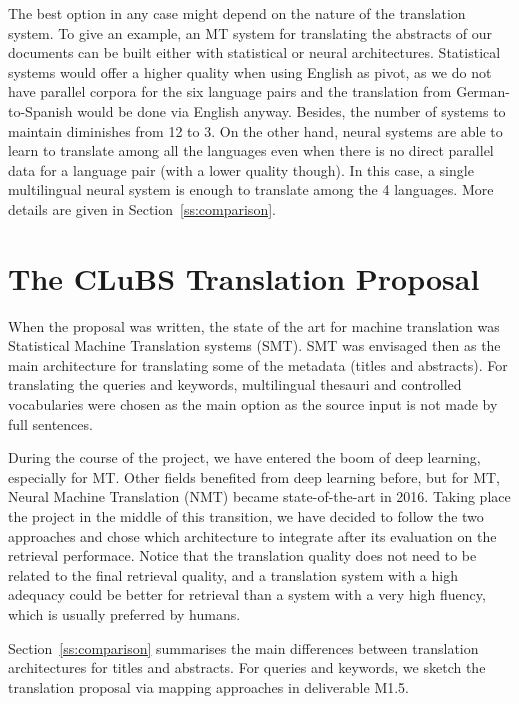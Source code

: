 \documentclass[a4paper,11pt]{article}
\begin{document}
The best option in any case might depend on the nature of the translation system. To give an example, an MT system for translating the abstracts of our documents can be built either with statistical or neural architectures. Statistical systems would offer a higher quality when using English as pivot, as we do not have parallel corpora for the six language pairs and the translation from German-to-Spanish would be done via English anyway. Besides, the number of systems to maintain diminishes from 12 to 3.
On the other hand, neural systems are able to learn to translate among all the languages even when there is no direct parallel data for a language pair (with a lower quality though). In this case, a single multilingual neural system is enough to translate among the 4 languages. More details are given in Section~\ref{ss:comparison}.



\section{The CLuBS Translation Proposal}
\label{s:proposal}

When the proposal was written, the state of the art for machine translation was Statistical Machine Translation systems (SMT). SMT was envisaged then as the main architecture for translating some of the metadata (titles and abstracts). For translating the queries and keywords, multilingual thesauri and controlled vocabularies were chosen as the main option as the source input is not made by full sentences.

During the course of the project, we have entered the boom of deep learning, especially for MT. Other fields benefited from deep learning before, but for MT, Neural Machine Translation (NMT) became state-of-the-art in 2016. Taking place the project in the middle of this transition, we have decided to follow the two approaches and chose which architecture to integrate after its evaluation on the retrieval performace. Notice that the translation quality does not need to be related to the final retrieval quality, and a translation system with a high adequacy could be better for retrieval than a system with a very high fluency, which is usually preferred by humans.

Section~\ref{ss:comparison} summarises the main differences between translation architectures for titles and abstracts. For queries and keywords, we sketch the translation proposal  via mapping approaches in deliverable M1.5.
\end{document}
